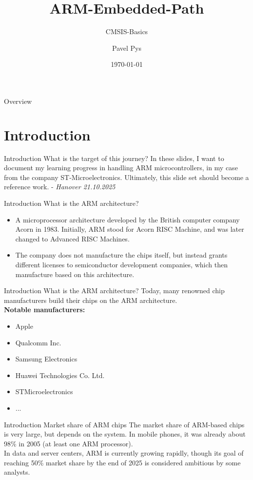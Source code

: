 \documentclass{beamer}
\title{ARM-Embedded-Path}
\subtitle{CMSIS-Basics}
\author{Pavel Pys}
\date{\today}
\begin{document}
	\begin{frame}
		\maketitle
	\end{frame}
	\begin{frame}{Overview}
		\tableofcontents
	\end{frame}
\section{Introduction}
\begin{frame}{Introduction}
	{What is the target of this journey?}
	In these slides, I want to document my learning progress in handling ARM microcontrollers, in my case from the company ST-Microelectronics. Ultimately, this slide set should become a reference work. - \textit{Hanover 21.10.2025}
\end{frame}
\begin{frame}{Introduction}
	{What is the ARM architecture?}
	\begin{itemize}
		\item A microprocessor architecture developed by the British computer company Acorn in 1983. Initially, ARM stood for Acorn RISC Machine, and was later changed to Advanced RISC Machines.
		\item The company does not manufacture the chips itself, but instead grants different licenses to semiconductor development companies, which then manufacture based on this architecture.
	\end{itemize}
\end{frame}
\begin{frame}{Introduction}
	{What is the ARM architecture?}
	Today, many renowned chip manufacturers build their chips on the ARM architecture.\\
	\textbf{Notable manufacturers:}
	\begin{itemize}
		\item Apple
		\item Qualcomm Inc.
		\item Samsung Electronics
		\item Huawei Technologies Co. Ltd.
		\item STMicroelectronics
		\item ...
	\end{itemize}
\end{frame}
\begin{frame}{Introduction}
	{Market share of ARM chips}
	The market share of ARM-based chips is very large, but depends on the system. In mobile phones, it was already about 98\% in 2005 (at least one ARM processor). \\
	\vspace{0.2cm}
	In data and server centers, ARM is currently growing rapidly, though its goal of reaching 50\% market share by the end of 2025 is considered ambitious by some analysts.
\end{frame}
\end{document}
